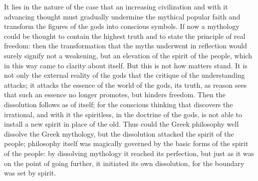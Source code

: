 \documentclass[12pt,a4paper,openany]{book}
\newcommand{\opage}[1]{\marginnote{\footnotesize\textit{[#1]}}}
\begin{document}
It lies in the nature of the case that an increasing civilization
and with it advancing thought must gradually
undermine the mythical popular faith and transform
the figures of the gods into conscious symbols. If now a
mythology could be thought to contain the highest truth
and to state the principle of real freedom: then
the transformation that the myths underwent in reflection
would surely signify not a weakening, but an elevation
of the spirit of the people, which in this way came to
clarity about itself. But this is not how matters
stand. It is not only the external reality of the gods
that the critique of the understanding attacks; it attacks the essence
of the world of the gods, its truth, as reason sees that such an
essence no longer promotes, but hinders freedom.
Then the dissolution follows as of itself; for the
conscious thinking that discovers the irrational, and with it
the spiritless, in the doctrine of the gods, is not able to install
a new spirit in place of the old. Thus could
\setcounter{footnote}{0}%
\opage{435}the Greek philosophy well dissolve the Greek mythology,
but the dissolution attacked the spirit of the people; philosophy itself
was magically governed by the basic forms of the spirit of the people:
by dissolving mythology it reached its perfection,
but just as it was on the point of going further,
it initiated its own dissolution, for the boundary was set
by spirit.
\end{document}
